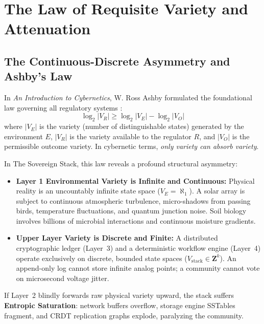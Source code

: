 \section{The Law of Requisite Variety and Attenuation}
\label{sec:l2_requisite_variety}

\subsection{The Continuous-Discrete Asymmetry and Ashby's Law}

In \textit{An Introduction to Cybernetics}, W. Ross Ashby formulated the foundational law governing all regulatory systems \parencite{ashby1956}:
\begin{equation}
\log_2 |V_R| \ge \log_2 |V_E| - \log_2 |V_O|
\label{eq:l2_ashby_formal}
\end{equation}
where $|V_E|$ is the variety (number of distinguishable states) generated by the environment $E$, $|V_R|$ is the variety available to the regulator $R$, and $|V_O|$ is the permissible outcome variety. In cybernetic terms, \textit{only variety can absorb variety}.

In The Sovereign Stack, this law reveals a profound structural asymmetry:
\begin{itemize}
    \item \textbf{Layer 1 Environmental Variety is Infinite and Continuous:} Physical reality is an uncountably infinite state space ($V_E = \aleph_1$). A solar array is subject to continuous atmospheric turbulence, micro-shadows from passing birds, temperature fluctuations, and quantum junction noise. Soil biology involves billions of microbial interactions and continuous moisture gradients.
    \item \textbf{Upper Layer Variety is Discrete and Finite:} A distributed cryptographic ledger (Layer~3) and a deterministic workflow engine (Layer~4) operate exclusively on discrete, bounded state spaces ($V_{\mathrm{stack}} \in \mathbf{Z}^k$). An append-only log cannot store infinite analog points; a community cannot vote on microsecond voltage jitter.
\end{itemize}

If Layer~2 blindly forwards raw physical variety upward, the stack suffers \textbf{Entropic Saturation}: network buffers overflow, storage engine SSTables fragment, and CRDT replication graphs explode, paralyzing the community.

